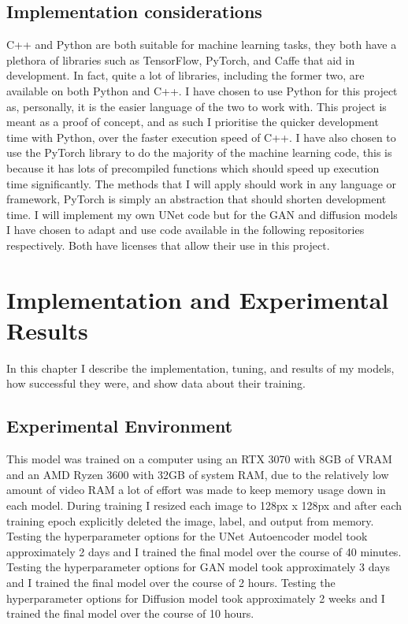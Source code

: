 \documentclass{UoYCSproject}
\begin{document}
\section{Implementation considerations}

C++ and Python are both suitable for machine learning tasks, they both have a plethora of libraries such as TensorFlow, PyTorch, and Caffe that aid in development. In fact, quite a lot of libraries, including the former two, are available on both Python and C++. I have chosen to use Python for this project as, personally, it is the easier language of the two to work with. This project is meant as a proof of concept, and as such I prioritise the quicker development time with Python, over the faster execution speed of C++. I have also chosen to use the PyTorch library to do the majority of the machine learning code, this is because it has lots of precompiled functions which should speed up execution time significantly. The methods that I will apply should work in any language or framework, PyTorch is simply an abstraction that should shorten development time. I will implement my own UNet code but for the GAN and diffusion models I have chosen to adapt and use code available in the following repositories \cite{PytorchPix2Pix, JanspiryPalette} respectively. Both have licenses that allow their use in this project. 

\chapter{Implementation and Experimental Results}

In this chapter I describe the implementation, tuning, and results of my models, how successful they were, and show data about their training.




\section{Experimental Environment}

This model was trained on a computer using an RTX 3070 with 8GB of VRAM and an AMD Ryzen 3600 with 32GB of system RAM, due to the relatively low amount of video RAM a lot of effort was made to keep memory usage down in each model. During training I resized each image to 128px x 128px and after each training epoch explicitly deleted the image, label, and output from memory.
Testing the hyperparameter options for the UNet Autoencoder model took approximately 2 days and I trained the final model over the course of 40 minutes.
Testing the hyperparameter options for GAN model took approximately 3 days and I trained the final model over the course of 2 hours.  
Testing the hyperparameter options for Diffusion model took approximately 2 weeks and I trained the final model over the course of 10 hours.
\end{document}
